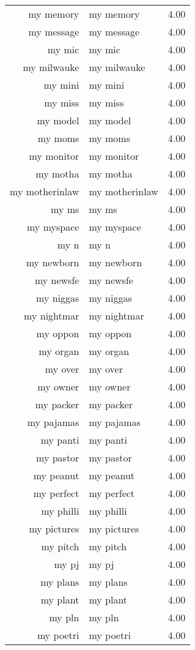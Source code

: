\begin{table}[ht]
\begin{tabular}{rlr}
  my memory & my memory & 4.00 \\ 
  my message & my message & 4.00 \\ 
  my mic & my mic & 4.00 \\ 
  my milwauke & my milwauke & 4.00 \\ 
  my mini & my mini & 4.00 \\ 
  my miss & my miss & 4.00 \\ 
  my model & my model & 4.00 \\ 
  my moms & my moms & 4.00 \\ 
  my monitor & my monitor & 4.00 \\ 
  my motha & my motha & 4.00 \\ 
  my motherinlaw & my motherinlaw & 4.00 \\ 
  my ms & my ms & 4.00 \\ 
  my myspace & my myspace & 4.00 \\ 
  my n & my n & 4.00 \\ 
  my newborn & my newborn & 4.00 \\ 
  my newsfe & my newsfe & 4.00 \\ 
  my niggas & my niggas & 4.00 \\ 
  my nightmar & my nightmar & 4.00 \\ 
  my oppon & my oppon & 4.00 \\ 
  my organ & my organ & 4.00 \\ 
  my over & my over & 4.00 \\ 
  my owner & my owner & 4.00 \\ 
  my packer & my packer & 4.00 \\ 
  my pajamas & my pajamas & 4.00 \\ 
  my panti & my panti & 4.00 \\ 
  my pastor & my pastor & 4.00 \\ 
  my peanut & my peanut & 4.00 \\ 
  my perfect & my perfect & 4.00 \\ 
  my philli & my philli & 4.00 \\ 
  my pictures & my pictures & 4.00 \\ 
  my pitch & my pitch & 4.00 \\ 
  my pj & my pj & 4.00 \\ 
  my plans & my plans & 4.00 \\ 
  my plant & my plant & 4.00 \\ 
  my pln & my pln & 4.00 \\ 
  my poetri & my poetri & 4.00 \\ 

\end{tabular}
\end{table}
